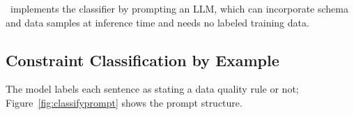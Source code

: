     
\system\ implements the classifier by prompting an LLM, which can incorporate schema and data samples at inference time and needs no labeled training data.

\subsection*{Constraint Classification by Example}

The model labels each sentence as stating a data quality rule or not; Figure~\ref{fig:classifyprompt} shows the prompt structure. 


